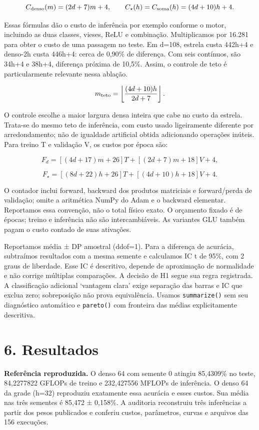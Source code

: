 \documentclass[10pt,a4paper]{article}
\begin{document}
\[
C_{\rm denso}(m)=(2d+7)m+4,\qquad C_{\star}(h)=C_{\rm soma}(h)=(4d+10)h+4.
\]

Essas fórmulas dão o custo de inferência por exemplo conforme o motor, incluindo as duas classes, vieses, ReLU e combinação. Multiplicamos por 16.281 para obter o custo de uma passagem no teste. Em d=108, estrela custa 442h+4 e denso-2h custa 446h+4: cerca de 0,90\% de diferença. Com seis contínuos, são 34h+4 e 38h+4, diferença próxima de 10,5\%. Assim, o controle de teto é particularmente relevante nessa ablação.


\[
m_{\rm teto}=\left\lfloor\frac{(4d+10)h}{2d+7}\right\rfloor.
\]

O controle escolhe a maior largura densa inteira que cabe no custo da estrela. Trata-se do mesmo teto de inferência, com custo usado ligeiramente diferente por arredondamento; não de igualdade artificial obtida adicionando operações inúteis. Para treino T e validação V, os custos por época são:


\[
F_d=[(4d+17)m+26]T+[(2d+7)m+18]V+4,
\]

\[
F_\star=[(8d+22)h+26]T+[(4d+10)h+18]V+4.
\]

O contador inclui forward, backward dos produtos matriciais e forward/perda de validação; omite a aritmética NumPy do Adam e o backward elementar. Reportamos essa convenção, não o total físico exato. O orçamento fixado é de épocas; treino e inferência não são intercambiáveis. As variantes GLU também pagam o custo contado de suas ativações.


Reportamos média ± DP amostral (ddof=1). Para a diferença de acurácia, subtraímos resultados com a mesma semente e calculamos IC t de 95\%, com 2 graus de liberdade. Esse IC é descritivo, depende de aproximação de normalidade e não corrige múltiplas comparações. A decisão de H1 segue sua regra registrada. A classificação adicional ‘vantagem clara’ exige separação das barras e IC que exclua zero; sobreposição não prova equivalência. Usamos \texttt{summarize()} sem seu diagnóstico automático e \texttt{pareto()} com fronteira das médias explicitamente descritiva.


\clearpage

\section*{6. Resultados}
\textbf{Referência reproduzida.} O denso 64 com semente 0 atingiu 85,4309\% no teste, 84,2277822 GFLOPs de treino e 232,427556 MFLOPs de inferência. O denso 64 da grade (h=32) reproduziu exatamente essa acurácia e esses custos. Sua média nas três sementes é 85,472 ± 0,158\%. A auditoria reconstruiu três inferências a partir dos pesos publicados e conferiu custos, parâmetros, curvas e arquivos das 156 execuções.
\end{document}
